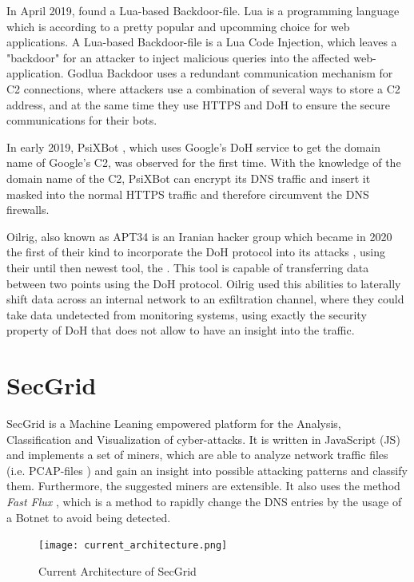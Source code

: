 In April 2019, \cite{GodluaBackdoor} found a Lua-based Backdoor-file. Lua \cite{Lua} is a programming language which is according to \cite{shyhunt} a pretty popular and upcomming choice for web applications. A Lua-based Backdoor-file is a Lua Code Injection, which leaves a "backdoor" for an attacker to inject malicious queries into the affected web-application. Godlua Backdoor uses a redundant communication mechanism for C2 connections, where attackers use a combination of several ways to store a C2 address, and at the same time they use HTTPS and DoH to ensure the secure communications for their bots.

In early 2019, PsiXBot \cite{psixbot}, which uses Google's DoH service to get the domain name of Google's C2, was observed for the first time. With the knowledge of the domain name of the C2, PsiXBot can encrypt its DNS traffic and insert it masked into the normal HTTPS traffic and therefore circumvent the DNS firewalls.

Oilrig, also known as APT34 is an Iranian hacker group which became in 2020 the first of their kind to incorporate the DoH protocol into its attacks \cite{Oilrig}, using their until then newest tool, the \cite{DNSExfiltrator}. This tool is capable of transferring data between two points using the DoH protocol. Oilrig used this abilities to laterally shift data across an internal network to an exfiltration channel, where they could take data undetected from monitoring systems, using exactly the security property of DoH that does not allow to have an insight into the traffic.

\section{SecGrid} \label{secgrid}
SecGrid \cite{SecGrid} is a Machine Leaning empowered platform for the Analysis, Classification and Visualization of cyber-attacks. It is written in JavaScript (JS) and implements a set of miners, which are able to analyze network traffic files (i.e. PCAP-files \cite{pcap}) and gain an insight into possible attacking patterns and classify them. Furthermore, the suggested miners are extensible. It also uses the method \textit{Fast Flux} \cite{psixbot2}, which is a method to rapidly change the DNS entries by the usage of a Botnet to avoid being detected.

\begin{figure} [h]
\texttt{[image: current\_architecture.png]}
\centering
\caption{Current Architecture of SecGrid \cite{SecGrid}}
\label{fig:curr_arch}
\end{figure}

